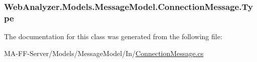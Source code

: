 \subsubsection[{Type}]{ Web\+Analyzer.\+Models.\+Message\+Model.\+Connection\+Message.\+Type\hspace{0.3cm}{\ttfamily [get]}}\label{class_web_analyzer_1_1_models_1_1_message_model_1_1_connection_message_a74c569109e3a9d19130c36fa9628a5f5}


The documentation for this class was generated from the following file\+:\begin{DoxyCompactItemize}
\item 
M\+A-\/\+F\+F-\/\+Server/\+Models/\+Message\+Model/\+In/\hyperlink{_connection_message_8cs}{Connection\+Message.\+cs}\end{DoxyCompactItemize}
